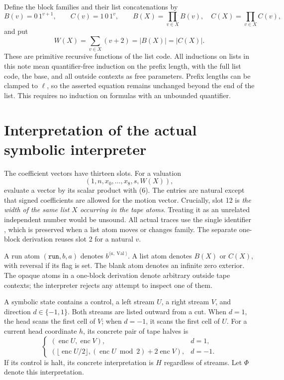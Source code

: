 \documentclass[11pt]{article}
\newcommand{\enc}{\operatorname{enc}}
\newcommand{\Val}{\operatorname{Val}}
\begin{document}
Define the block families and their list concatenations by
\[
 B(v)=0\,1^{v+1},\qquad C(v)=1\,0\,1^v,\qquad
 B(X)=\prod_{v\in X}B(v),\quad C(X)=\prod_{v\in X}C(v),
\]
and put
\[
 W(X)=\sum_{v\in X}(v+2)=|B(X)|=|C(X)|.                          \tag{5}
\]
These are primitive recursive functions of the list code.  All inductions
on lists in this note mean quantifier-free induction on the prefix length,
with the full list code, the base, and all outside contexts as free
parameters.  Prefix lengths can be clamped to $\ell$, so the asserted
equation remains unchanged beyond the end of the list.  This requires no
induction on formulas with an unbounded quantifier.

\section{Interpretation of the actual symbolic interpreter}

The coefficient vectors have thirteen slots.  For a valuation
\[
 (1,n,x_0,\ldots,x_8,s,W(X)),                                    \tag{6}
\]
evaluate a vector by its scalar product with (6).  The entries are natural
except that signed coefficients are allowed for the motion vector.
Crucially, slot 12 is \emph{the width of the same list $X$ occurring in the
tape atoms}.  Treating it as an unrelated independent number would be
unsound.  All actual traces use the single identifier
, which is preserved when a list atom moves or changes
family.  The separate one-block derivation reuses slot 2 for a natural $v$.

A run atom $(\texttt{run},b,a)$ denotes $b^{\langle a,\Val\rangle}$.
A list atom denotes $B(X)$ or $C(X)$, with reversal if its flag is set.
The blank atom denotes an infinite zero exterior.  The opaque atoms in a
one-block derivation denote arbitrary outside tape contexts; the
interpreter rejects any attempt to inspect one of them.

A symbolic state contains a control, a left stream $U$, a right stream
$V$, and direction $d\in\{-1,1\}$.  Both streams are listed outward from
a cut.  When $d=1$, the head scans the first cell of $V$; when $d=-1$, it
scans the first cell of $U$.  For a current head coordinate $h$, its
concrete pair of tape halves is
\[
\begin{cases}
(\enc U,\enc V),&d=1,\\
(\lfloor\enc U/2\rfloor,
 (\enc U\bmod2)+2\enc V),&d=-1.
\end{cases}                                                    \tag{7}
\]
If its control is halt, its concrete interpretation is $H$ regardless of
streams.  Let $\Phi$ denote this interpretation.
\end{document}

